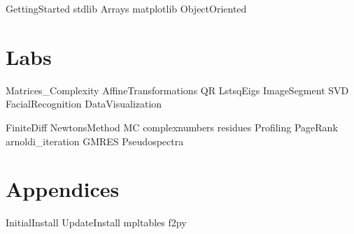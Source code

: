 \documentclass[nociteref]{SIAM-GH-book}
\begin{document}
{GettingStarted}
{stdlib}
{Arrays}
{matplotlib}
{ObjectOriented}

\part{Labs}
{Matrices_Complexity}
{AffineTransformations}
{QR}
{LstsqEigs}
{ImageSegment}
{SVD}
{FacialRecognition}
{DataVisualization}

{FiniteDiff}
{NewtonsMethod}
{MC}
{complexnumbers}
{residues}
{Profiling}
{PageRank}
{arnoldi_iteration}
{GMRES}
{Pseudospectra}


\part{Appendices}
\begin{appendices}
{InitialInstall}
{UpdateInstall}
{mpltables}
{f2py}
\end{appendices}
\end{document}
